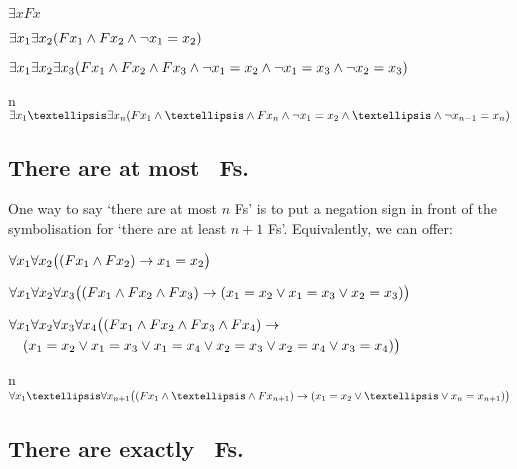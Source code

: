 \begin{ekey}
\item[\text{one}] $\exists xFx$
\item[\text{two}] $\exists x_1\exists x_2(Fx_1 \wedge Fx_2 \wedge \neg x_1  = x_2)$
\item[\text{three}] $\exists x_1\exists x_2\exists x_3(Fx_1 \wedge Fx_2 \wedge Fx_3 \wedge \neg x_1 = x_2 \wedge\neg x_1 = x_3 \wedge \neg x_2 = x_3)$
\item[n] $\exists x_1…\exists x_n(Fx_1 \eand …\eand Fx_n \eand \enot x_1 = x_2 \eand …\eand \enot x_{n-1} = x_n)$ 
\end{ekey}

\subsection*{There are at most \blank\ Fs.}
\label{summary.atmost}

One way to say `there are at most $n$ Fs' is to put a negation sign in front of the symbolisation for `there are at least $n+1$ Fs'. Equivalently, we can offer:
\begin{ekey}
\item[\text{one}] $\forall x_1\forall x_2\bigl( (Fx_1 \wedge Fx_2) \rightarrow x_1=x_2\bigr)$
\item[\text{two}] $\forall x_1\forall x_2\forall x_3\bigl( (Fx_1 \wedge Fx_2 \wedge Fx_3) \rightarrow (x_1=x_2 \vee x_1=x_3 \vee x_2=x_3) \bigr)$
\item[\text{three}] $\begin{multlined}[t]
	\forall x_1\forall x_2\forall x_3\forall x_4\bigl( (Fx_1 \eand Fx_2 \eand Fx_3 \eand Fx_4) \eif \\
(x_1=x_2 \eor x_1=x_3 \eor x_1=x_4 \eor x_2=x_3 \eor x_2=x_4 \eor x_3=x_4) \bigr)
\end{multlined}$
\item[n]$\forall x_1…\forall x_{n+1}
\bigl( (Fx_1\eand … \eand Fx_{n+1}) \eif (x_1=x_2 \eor … \eor x_n=x_{n+1}) \bigr)$ 
\end{ekey}
\subsection*{There are exactly \blank\ Fs.}
\label{summary.exactly}

